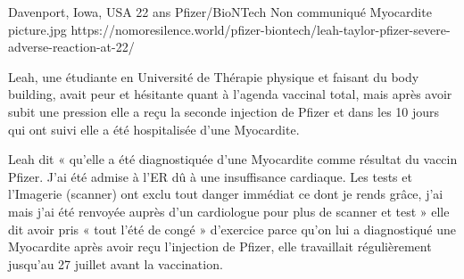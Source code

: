 {Davenport, Iowa, USA}
{22 ans}
{Pfizer/BioNTech}
{Non communiqué}
{Myocardite}
{picture.jpg}
{https://nomoresilence.world/pfizer-biontech/leah-taylor-pfizer-severe-adverse-reaction-at-22/}
{

Leah, une étudiante en Université de Thérapie physique et faisant du body building, avait peur et hésitante quant à l’agenda vaccinal total, mais après avoir subit une pression elle a reçu la seconde injection de Pfizer et dans les 10 jours qui ont suivi elle a été hospitalisée d’une Myocardite.

Leah dit « qu’elle a été diagnostiquée d’une Myocardite comme résultat du vaccin Pfizer. J’ai été admise à l’ER dû à une insuffisance cardiaque. Les tests et l’Imagerie (scanner) ont exclu tout danger immédiat ce dont je rends grâce, j’ai mais j’ai été renvoyée auprès d’un cardiologue pour plus de scanner et test » elle dit avoir pris « tout l’été de congé » d’exercice parce qu’on lui a diagnostiqué une Myocardite après avoir reçu l’injection de Pfizer, elle travaillait régulièrement jusqu’au 27 juillet avant la vaccination.

}
